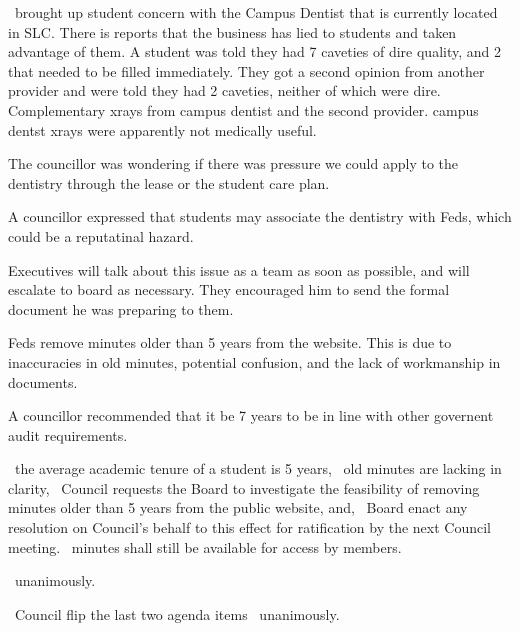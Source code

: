 \begin{information}
    \seneca\ brought up student concern with the Campus Dentist that is currently
    located in SLC. There is reports that the business has lied to students and
    taken advantage of them. A student was told they had 7 caveties of dire
    quality, and 2 that needed to be filled immediately. They got a second opinion
    from another provider and were told they had 2 caveties, neither of which
    were dire. Complementary xrays from campus dentist and the second provider.
    campus dentst xrays were apparently not medically useful.

    The councillor was wondering if there was pressure we could apply to the
    dentistry through the lease or the student care plan.

    A councillor expressed that students may associate the dentistry with Feds,
    which could be a reputatinal hazard.

    Executives will talk about this issue as a team as soon as possible, and
    will escalate to board as necessary. They encouraged him to send the formal
    document he was preparing to them.

\end{information}

\begin{motion}
    Feds remove minutes older than 5 years from the website. This is due
    to inaccuracies in old minutes, potential confusion, and the lack of 
    workmanship in documents.

    A councillor recommended that it be 7 years to be in line with other
    governent audit requirements.

    \whereas\ the average academic tenure of a student is 5 years,
    \whereas\ old minutes are lacking in clarity,
    \birt\ Council requests the Board to investigate the feasibility of 
    removing minutes older than 5 years from the public website, and,
    \bifrt\ Board enact any resolution on Council's behalf to this effect for
    ratification by the next Council meeting.
    \bifrt\ minutes shall still be available for access by members.
    \movers{\seneca}{\stephenie}

    \carries\ unanimously. 

\end{motion}

\begin{motion}
    \birt\ Council flip the last two agenda items
    \carries\ unanimously.
\end{motion}

